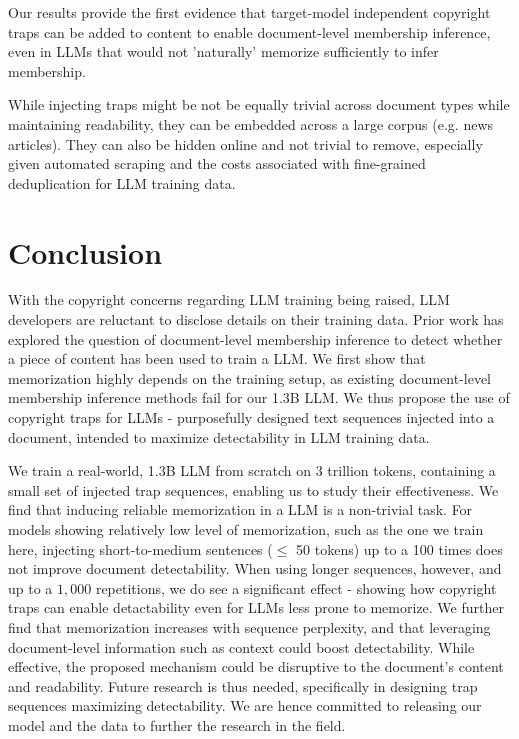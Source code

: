 Our results provide the first evidence that target-model independent copyright traps can be added to content to enable document-level membership inference, even in LLMs that would not 'naturally' memorize sufficiently to infer membership. 

While injecting traps might be not be equally trivial across document types while maintaining readability, they can be embedded across a large corpus (e.g. news articles). They can also be hidden online and not trivial to remove, especially given automated scraping and the costs associated with fine-grained deduplication for LLM training data. 


\section{Conclusion}

With the copyright concerns regarding LLM training being raised, LLM developers are reluctant to disclose details on their training data. Prior work has explored the question of document-level membership inference to detect whether a piece of content has been used to train a LLM. We first show that memorization highly depends on the training setup, as existing document-level membership inference methods fail for our 1.3B LLM. We thus propose the use of copyright traps for LLMs - purposefully designed text sequences injected into a document, intended to maximize detectability in LLM training data. 

We train a real-world, 1.3B LLM from scratch on 3 trillion tokens, containing a small set of injected trap sequences, enabling us to study their effectiveness. We find that inducing reliable memorization in a LLM is a non-trivial task. For models showing relatively low level of memorization, such as the one we train here, injecting short-to-medium sentences ($\leq $ 50 tokens) up to a 100 times does not improve document detectability. When using longer sequences, however, and up to a $1,000$ repetitions, we do see a significant effect - showing how copyright traps can enable detactability even for LLMs less prone to memorize. We further find that memorization increases with sequence perplexity, and that leveraging document-level information such as context could boost detectability. While effective, the proposed mechanism could be disruptive to the document's content and readability. Future research is thus needed, specifically in designing trap sequences maximizing detectability. We are hence committed to releasing our model and the data to further the research in the field.
